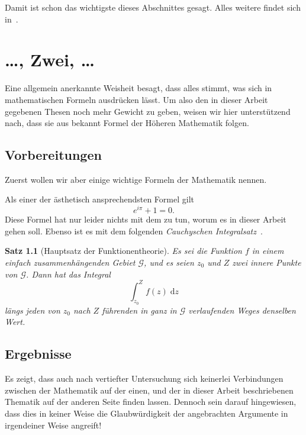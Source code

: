 \documentclass{scrbook}
\newtheorem{Satz}{Satz}
\begin{document}
Damit ist schon das wichtigste dieses Abschnittes gesagt.  Alles weitere findet
sich in~\cite{lakoff87_women_fire_danger_thing}.

\chapter{\dots, Zwei, \dots}
\label{cha:zwei}

Eine allgemein anerkannte Weisheit besagt, dass alles stimmt, was sich in
mathematischen Formeln ausdrücken lässt.  Um also den in dieser Arbeit gegebenen
Thesen noch mehr Gewicht zu geben, weisen wir hier unterstützend nach, dass sie
aus bekannt Formel der Höheren Mathematik folgen.

\section{Vorbereitungen}
\label{sec:vorbereitungen}

Zuerst wollen wir aber einige wichtige Formeln der Mathematik nennen.

Als einer der ästhetisch ansprechendsten Formel gilt
\begin{equation}
  \label{eq:1}
  e^{i\pi} + 1 = 0.
\end{equation}
Diese Formel hat nur leider nichts mit dem zu tun, worum es in dieser Arbeit
gehen soll.  Ebenso ist es mit dem folgenden \emph{Cauchyschen
  Integralsatz}~\parencite{knopp70_funkt_i}.

\begin{Satz}[Hauptsatz der Funktionentheorie]
  Es sei die Funktion $f$ in einem einfach zusammenhängenden Gebiet
  $\mathcal{G}$, und es seien $z_{0}$ und $Z$ zwei innere Punkte von
  $\mathcal{G}$.  Dann hat das Integral
  \begin{equation*}
    \int_{z_{0}}^{Z} \! f(z) \; \mathrm{d}z
  \end{equation*}
  längs jeden von $z_{0}$ nach $Z$ führenden in ganz in $\mathcal{G}$
  verlaufenden Weges denselben Wert.
\end{Satz}

\section{Ergebnisse}
\label{sec:ergebnisse}

Es zeigt, dass auch nach vertiefter Untersuchung sich keinerlei Verbindungen
zwischen der Mathematik auf der einen, und der in dieser Arbeit beschriebenen
Thematik auf der anderen Seite finden lassen.  Dennoch sein darauf hingewiesen,
dass dies in keiner Weise die Glaubwürdigkeit der angebrachten Argumente in
irgendeiner Weise angreift!
\end{document}
